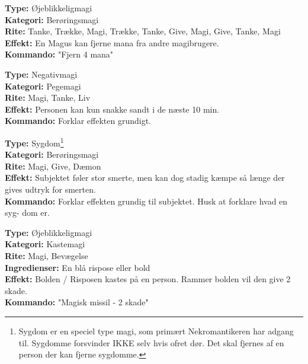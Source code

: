 \begin{lærmagi*}
\textbf{Type:} Øjeblikkeligmagi\\
\textbf{Kategori:} Berøringsmagi\\
\textbf{Rite:} Tanke, Trække, Magi, Trække, Tanke, Give, Magi, Give, Tanke, Magi\\
\textbf{Effekt:} En Magus kan fjerne mana fra andre magibrugere.\\
\textbf{Kommando:} "Fjern 4 mana"\\
\end{lærmagi*}

\begin{lærmagi*}[Sandhed]
\textbf{Type:} Negativmagi\\
\textbf{Kategori:} Pegemagi\\
\textbf{Rite:} Magi, Tanke, Liv\\
\textbf{Effekt:} Personen kan kun snakke sandt i de næste 10 min.\\
\textbf{Kommando:} Forklar effekten grundigt.\\
\end{lærmagi*}

\begin{lærmagi*}[Forrådnelse]
\textbf{Type:} Sygdom\footnote{Sygdom er en speciel type magi, som primært Nekromantikeren har adgang til. Sygdomme forsvinder IKKE selv hvis ofret dør. Det skal fjernes af en person der kan fjerne sygdomme.}\\
\textbf{Kategori:} Berøringsmagi\\
\textbf{Rite:} Magi, Give, Dæmon\\
\textbf{Effekt:} Subjektet føler stor smerte, men kan dog stadig kæmpe så længe der gives udtryk for smerten.\\
\textbf{Kommando:} Forklar effekten grundig til subjektet. Husk at forklare hvad en syg-
dom er.\\
\end{lærmagi*}

\begin{lærmagi*}
\textbf{Type:} Øjeblikkeligmagi\\
\textbf{Kategori:} Kastemagi\\
\textbf{Rite:} Magi, Bevægelse\\
\textbf{Ingredienser:} En blå rispose eller bold\\
\textbf{Effekt:} Bolden / Risposen kastes på en person. Rammer bolden vil den give 2 skade.\\
\textbf{Kommando:} "Magisk missil - 2 skade"\\
\end{lærmagi*}

